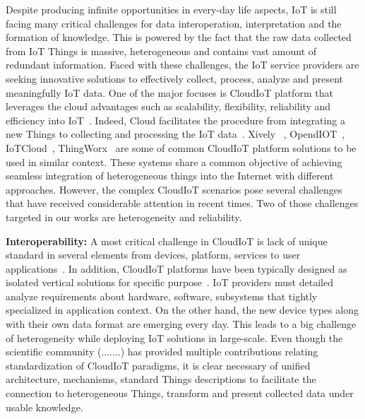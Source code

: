 Despite producing infinite opportunities in every-day life aspects, IoT is still facing many critical challenges for data interoperation, interpretation and the formation of knowledge. This is powered by the fact that the raw data collected from IoT Things is massive, heterogeneous and contains vast amount of redundant information. Faced with these challenges, the IoT service providers are seeking innovative solutions to effectively collect, process, analyze and present meaningfully IoT data. One of the major focuses is CloudIoT platform that leverages the cloud advantages such as scalability, flexibility, reliability and efficiency into IoT~\cite{fox2012architecture}\cite{dash2010survey}\cite{suciu2013smart}. Indeed, Cloud facilitates the procedure from integrating a new Things to collecting and processing the IoT data~\cite{botta2016integration}. Xively ~\cite{}, OpendIOT~\cite{}, IoTCloud~\cite{}, ThingWorx~\cite{} are some of common CloudIoT platform solutions to be used in similar context. These systems share a common objective of achieving seamless integration of heterogeneous things into the Internet with different approaches. However, the complex CloudIoT scenarios pose several challenges that have received considerable attention in recent times. Two of those challenges targeted in our works are heterogeneity and reliability.   \\
\par \textbf{Interoperability: } A most critical challenge in CloudIoT is lack of unique standard in several elements from devices, platform, services to user applications~\cite{bandyopadhyay2011internet}. In addition, CloudIoT platforms have been typically designed as isolated vertical solutions for specific purpose~\cite{dinh2013survey}. IoT providers must detailed analyze requirements about hardware, software, subsystems that tightly specialized in application context. On the other hand, the new device types along with their own data format are emerging every day. This leads to a big challenge of heterogeneity while deploying IoT solutions in large-scale. Even though the scientific community (.......) has provided multiple contributions relating standardization of CloudIoT paradigms, it is clear necessary of unified architecture, mechanisms, standard Things descriptions to facilitate the connection to heterogeneous Things, transform and present collected data under usable knowledge.~\cite{Botta2016}\\

